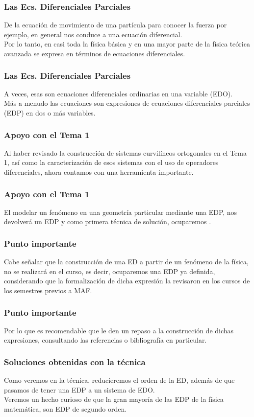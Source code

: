\documentclass[12pt]{beamer}
\begin{document}
\begin{frame}
\frametitle{Las Ecs. Diferenciales Parciales}
De la ecuación de movimiento de una partícula para conocer la fuerza por ejemplo, en general nos conduce a una ecuación diferencial.
\\
\bigskip
\pause
Por lo tanto, en casi toda la física  básica y en una mayor parte de la física teórica avanzada se expresa en términos de ecuaciones diferenciales.
\end{frame}
\begin{frame}
\frametitle{Las Ecs. Diferenciales Parciales}
A veces, esas son ecuaciones diferenciales ordinarias en una variable (EDO).
\\
\bigskip
\pause
Más a menudo las ecuaciones son expresiones de ecuaciones diferenciales parciales (EDP) en dos o más variables.
\end{frame}
\begin{frame}
\frametitle{Apoyo con el Tema 1}
Al haber revisado la construcción de sistemas curvilíneos ortogonales en el Tema 1, así como la caracterización de esos sistemas con el uso de operadores diferenciales, ahora contamos con una herramienta importante.
\end{frame}
\begin{frame}
\frametitle{Apoyo con el Tema 1}
El modelar un fenómeno en una geometría particular mediante una EDP, nos devolverá un EDP y como primera técnica de solución, ocuparemos .
\end{frame}
\begin{frame}
\frametitle{Punto importante}
Cabe señalar que la construcción de una ED a partir de un fenómeno de la física, no se realizará en el curso, es decir, ocuparemos una EDP ya definida, considerando que la formalización de dicha expresión la revisaron en los cursos de los semestres previos a MAF.
\end{frame}
\begin{frame}
\frametitle{Punto importante}
Por lo que es recomendable que le den un repaso a la construcción de dichas expresiones, consultando las referencias o bibliografía en particular.
\end{frame}
\begin{frame}
\frametitle{Soluciones obtenidas con la técnica}
Como veremos en la técnica, reducieremos el orden de la ED, además de que pasamos de tener una EDP a un sistema de EDO.
\\
\bigskip
Veremos un hecho curioso de que la gran mayoría de las EDP de la física matemática, son EDP de segundo orden.
\end{frame}
\end{document}
